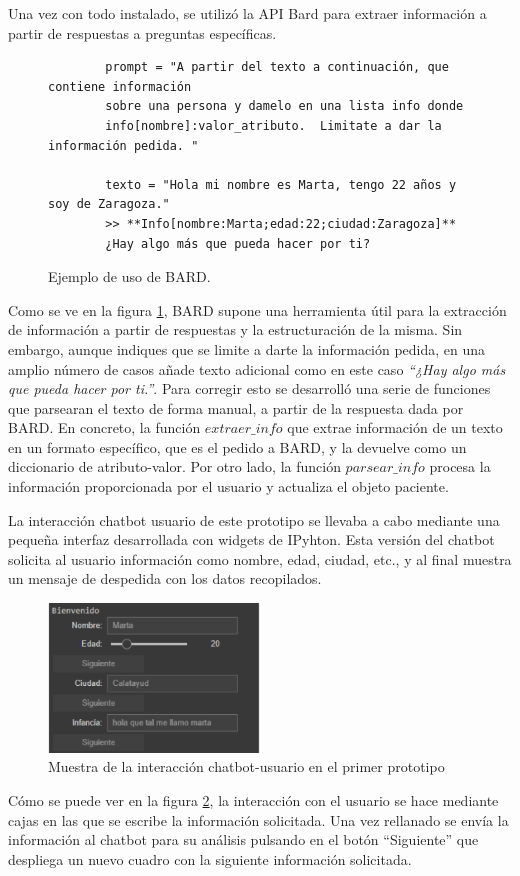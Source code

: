 Una vez con todo instalado, se utilizó la API Bard para extraer información a partir de respuestas a preguntas específicas. 
\begin{figure}[h]
	\centering
	\begin{verbatim}
		prompt = "A partir del texto a continuación, que contiene información
		sobre una persona y damelo en una lista info donde
		info[nombre]:valor_atributo.  Limitate a dar la información pedida. "
		
		texto = "Hola mi nombre es Marta, tengo 22 años y soy de Zaragoza."
		>> **Info[nombre:Marta;edad:22;ciudad:Zaragoza]** 
		¿Hay algo más que pueda hacer por ti?
	\end{verbatim}
	\caption{ Ejemplo de uso de BARD.}
	\label{fig:ejemploBARD}
\end{figure}
Como se ve en la figura \ref{fig:ejemploBARD}, BARD supone una herramienta útil para la extracción de información a partir de respuestas y la estructuración de la misma. Sin embargo, aunque indiques que se limite a darte la información pedida, en una amplio número de casos añade texto adicional como en este caso \textit{``¿Hay algo más que pueda hacer por ti.''}. Para corregir esto se desarrolló una serie de funciones que parsearan el texto de forma manual, a partir de la respuesta dada por BARD. En concreto, la función $extraer\_info$ que extrae información de un texto en un formato específico, que es el pedido a BARD, y la devuelve como un diccionario de atributo-valor. Por otro lado, la función $parsear\_info$ procesa la información proporcionada por el usuario y actualiza el objeto paciente. 

La interacción chatbot usuario de este prototipo se llevaba a cabo mediante una pequeña interfaz desarrollada con widgets de IPyhton. 
Esta versión del chatbot solicita al usuario información como nombre, edad, ciudad, etc., y al final muestra un mensaje de despedida con los datos recopilados.
\begin{figure}[h]
	\centering
	\includegraphics[width=0.5\textwidth]{Imagenes/Iwidget}
	\caption{Muestra de la interacción chatbot-usuario en el primer prototipo}
	\label{fig:interfazPrototipo1}
\end{figure}
Cómo se puede ver en la figura \ref{fig:interfazPrototipo1}, la interacción con el usuario se hace mediante cajas en las que se escribe la información solicitada. Una vez rellanado se envía la información al chatbot para su análisis pulsando en el botón ``Siguiente'' que despliega un nuevo cuadro con la siguiente información solicitada. 

